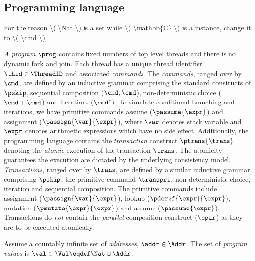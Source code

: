 \subsection{Programming language}

\ac{For the reason \( \Nat \) is a set while \( \mathbb{C} \)  is a instance, change it to \( \cmd \) }

\emph{A program} \( \prog \) contains fixed numbers of top level threads and there is no dynamic fork and join.
Each thread has a unique thread identifier \( \thid \in \ThreadID \) and associated \emph{commands}.
The \emph{commands}, ranged over by $\cmd$, are defined by an inductive grammar comprising the standard constructs of $\pskip$, sequential composition ($\cmd; \cmd$), non-deterministic choice ($\cmd+\cmd$) and iterations ($\cmd^*$).
To simulate conditional branching and iterations, we have primitive commands assume (\( \passume{\expr}\)) and assignment (\( \passign{\var}{\expr} \)), where \( \var \) denotes stack variable and \( \expr \) denotes arithmetic expressions which have no side effect.
Additionally, the programming language contains the \emph{transaction} construct $\ptrans{\trans}$ denoting the \emph{atomic} execution of the transaction $\trans$. 
The atomicity guarantees the execution are dictated by the underlying consistency model.
\emph{Transactions}, ranged over by $\trans$, are defined by a similar inductive grammar comprising $\pskip$, the primitive command \( \transpri \), non-deterministic choice, iteration and sequential composition.
The primitive commands include assignment (\( \passign{\var}{\expr}\)), lookup (\( \pderef{\expr}{\expr}\)), mutation (\( \pmutate{\expr}{\expr}\)) and assume (\( \passume{\expr}\)). 
Transactions do \emph{not} contain the \emph{parallel} composition construct ($\ppar$) as they are to be executed atomically.

\begin{defn}
\label{def:program_values}
Assume a countably infinite set of \emph{addresses}, $\addr \in \Addr$. The set of \emph{program values} is $\val \in \Val \eqdef \Nat \cup \Addr$.
\end{defn}

